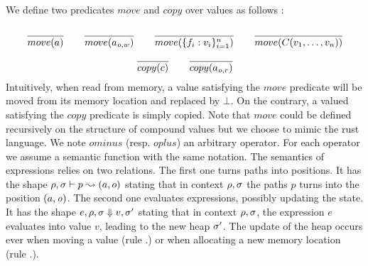 We define two predicates $move$ and $copy$ over values as follows :
$$
\begin{array}{c}
\cfrac{}{move(a)} \qquad 
\cfrac{}{move(a_{{\mathit{o}},w})} \qquad \cfrac{}{move(\{f_i:v_i\}_{i=1}^n)} \qquad \cfrac{}{move(C(v_1,\ldots,v_n))}
\\
\cfrac{}{copy(c)} \qquad \cfrac{}{copy(a_{{\mathit{o}},r})}
\end{array}
$$
Intuitively, when read from memory, a value satisfying the $move$ predicate will be moved from its memory location and replaced by $\bot$.
On the contrary, a valued satisfying the $copy$ predicate is simply copied. Note that $move$ could be defined recursively on the structure of 
compound values but we choose to mimic the rust language.
We note $ominus$ (resp. $oplus$) an arbitrary operator. For each operator we assume a semantic function with the same notation.
The semantics of expressions relies on two relations. The first one turns paths into positions. 
It has the shape $\rho,\sigma \vdash p \leadsto (a,o)$ stating that in context $\rho,\sigma$ the paths $p$ turns into the position 
$(a,{\mathit{o}})$. The second one evaluates expressions, possibly updating the state. It has the shape 
$e,\rho,\sigma \Downarrow v,\sigma'$ stating that in context $\rho,\sigma$, the expression $e$ evaluates into value $v$, 
leading to the new heap $\sigma'$. The update of the heap occurs ever when moving a value (rule .) or when allocating 
a new memory location (rule .).
